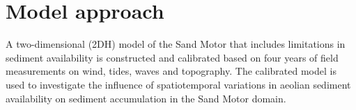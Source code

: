 %
%
%
%

\section{Model approach}


A two-dimensional (2DH) model of the Sand Motor that includes
limitations in sediment availability is constructed and calibrated
based on four years of field measurements on wind, tides, waves and
topography. The calibrated model is used to investigate the influence
of spatiotemporal variations in aeolian sediment availability on
sediment accumulation in the Sand Motor domain.

